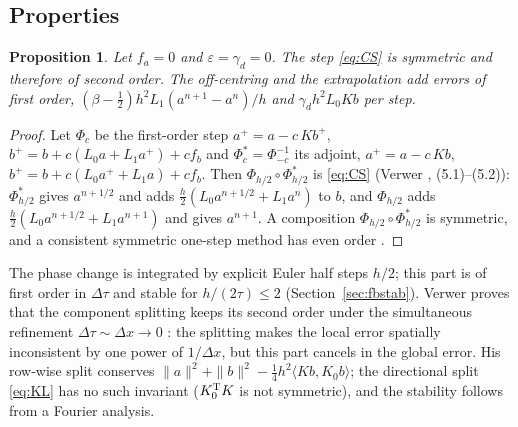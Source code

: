 \documentclass[11pt,a4paper]{article}
\newcommand{\dtau}{\Delta\tau}
\newtheorem{proposition}{Proposition}
\begin{document}
\subsection{Properties}
\begin{proposition}\label{prop:sym}
Let $f_a=0$ and $\varepsilon=\gamma_d=0$. The step \eqref{eq:CS} is symmetric and therefore of second order. The
off-centring and the extrapolation add errors of first order, $(\beta-\tfrac12)h^2L_1(a^{n+1}-a^n)/h$ and $\gamma_dh^2L_0Kb$ per step.
\end{proposition}
\begin{proof}
Let $\Phi_c$ be the first-order step $a^+=a-c\,Kb^+$, $b^+=b+c(L_0a+L_1a^+)+cf_b$ and $\Phi_c^*=\Phi_{-c}^{-1}$ its
adjoint, $a^+=a-c\,Kb$, $b^+=b+c(L_0a^++L_1a)+cf_b$. Then $\Phi_{h/2}\circ\Phi_{h/2}^*$ is \eqref{eq:CS} (Verwer
\cite{verwer}, (5.1)--(5.2)): $\Phi^*_{h/2}$ gives $a^{n+1/2}$ and adds $\tfrac h2(L_0a^{n+1/2}+L_1a^n)$ to $b$, and
$\Phi_{h/2}$ adds $\tfrac h2(L_0a^{n+1/2}+L_1a^{n+1})$ and gives $a^{n+1}$. A composition $\Phi_{h/2}\circ\Phi^*_{h/2}$ is
symmetric, and a consistent symmetric one-step method has even order \cite[Thm.~II.3.2]{hlw}.
\end{proof}
The phase change is integrated by explicit Euler half steps $h/2$; this part is of first order in $\dtau$ and
stable for $h/(2\tau)\le2$ (Section~\ref{sec:fbstab}). Verwer proves that the component splitting keeps its second
order under the simultaneous refinement $\dtau\sim\Delta x\to0$ \cite[Sect.~3.2]{verwer}: the splitting makes the local
error spatially inconsistent by one power of $1/\Delta x$, but this part cancels in the global error. His
row-wise split conserves $\|a\|^2+\|b\|^2-\tfrac14h^2\langle Kb,K_0b\rangle$; the directional split \eqref{eq:KL} has no such
invariant ($K_0^{\rm T}K$ is not symmetric), and the stability follows from a Fourier analysis.
\end{document}

